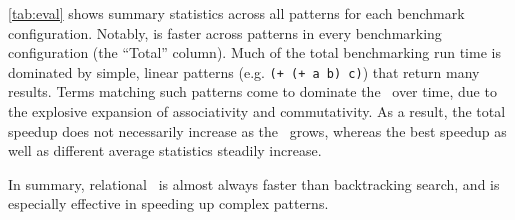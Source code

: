 \autoref{tab:eval}
 shows summary statistics across all patterns for each benchmark configuration.
Notably, \GJ is faster across patterns in
 every benchmarking configuration (the ``Total'' column).
Much of the total benchmarking run time is dominated by
 simple, linear patterns (e.g. \texttt{(+ (+ a b) c)})
 that return many results.
Terms matching such patterns come to dominate
 the \egraph\ over time, due to the explosive expansion of
 associativity and commutativity.
As a result, the total speedup does not necessarily increase
 as the \egraph\ grows,
 whereas the best speedup as well as different average statistics
 steadily increase.

In summary, relational \ematching\ is almost always faster than backtracking search,
and is especially effective in speeding up complex patterns.

